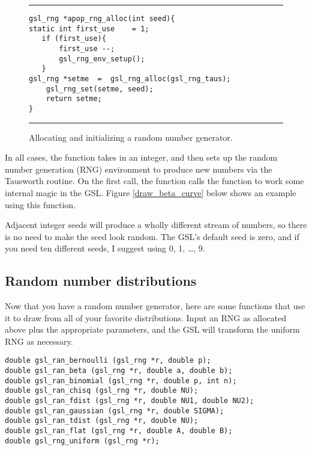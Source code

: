 \begin{figure}
	\hrule\vskip4pt
\begin{lstlisting}[frame=none]
gsl_rng *apop_rng_alloc(int seed){
static int first_use    = 1;
   if (first_use){
       first_use --;
       gsl_rng_env_setup();
   }
gsl_rng *setme  =  gsl_rng_alloc(gsl_rng_taus);
    gsl_rng_set(setme, seed);
    return setme;
}
\end{lstlisting}
	\hrule
\caption{Allocating and initializing a random number generator.}
\label{rng_alloc}
\end{figure}

In all cases, the function takes in an integer, and then sets up the
random number generation (RNG) environment to produce new numbers
via the Tausworth routine.  On the first call, the function calls the
 function to work some internal magic in
the GSL. Figure \ref{draw_beta_curve} below shows an example using this
function.

Adjacent integer seeds will produce a wholly different stream of numbers,
so there is no need to make the seed look random. The GSL's default seed is
zero, and if you need ten different seeds, I suggest using 0, 1, \dots, 9.

\subsection{Random number distributions}
Now that you have a random number generator, here are some functions that use it to draw from all of your favorite distributions. Input an RNG as allocated above plus the appropriate parameters, and the GSL will transform the uniform RNG as necessary.
    
  
 

\begin{lstlisting}
double gsl_ran_bernoulli (gsl_rng *r, double p);
double gsl_ran_beta (gsl_rng *r, double a, double b);
double gsl_ran_binomial (gsl_rng *r, double p, int n);
double gsl_ran_chisq (gsl_rng *r, double NU);
double gsl_ran_fdist (gsl_rng *r, double NU1, double NU2);
double gsl_ran_gaussian (gsl_rng *r, double SIGMA);
double gsl_ran_tdist (gsl_rng *r, double NU);
double gsl_ran_flat (gsl_rng *r, double A, double B);
double gsl_rng_uniform (gsl_rng *r);
\end{lstlisting}

